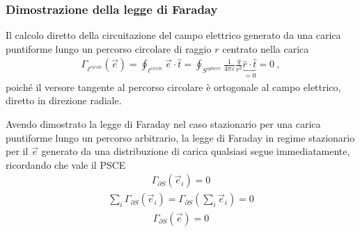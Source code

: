 \documentclass[letterpaper,10pt,italian]{jupyterBook}
\begin{document}
\subsubsection*{Dimostrazione della legge di Faraday}

\sphinxAtStartPar
{}
Il calcolo diretto della circuitazione del campo elettrico generato da una carica puntiforme lungo un percorso circolare di raggio \(r\) centrato nella carica
\begin{equation*}
\begin{split}\Gamma_{\ell^{circle}}(\vec{e}) = \oint_{\ell^{circle}} \vec{e} \cdot \hat{t} = \oint_{S^{sphere}} \frac{1}{4 \pi \varepsilon}\frac{q}{r^2} \underbrace{\hat{r} \cdot \hat{t}}_{=0} = 0 \ ,  \end{split}
\end{equation*}
\sphinxAtStartPar
poiché il versore tangente al percorso circolare è ortogonale al campo elettrico, diretto in direzione radiale.

\sphinxAtStartPar
{}

\sphinxAtStartPar
{}
Avendo dimostrato la legge di Faraday nel caso stazionario per una carica puntiforme lungo un percorso arbitrario, la legge di Faraday in regime stazionario per il \(\vec{e}\) generato da una distribuzione di carica qualsiasi segue immediatamente, ricordando che vale il PSCE
\begin{equation*}
\begin{split}\Gamma_{\partial S}(\vec{e}_i) = 0\end{split}
\end{equation*}\begin{equation*}
\begin{split}\sum_i \Gamma_{\partial S}(\vec{e}_i) = \Gamma_{\partial S} \left(\sum_i \vec{e}_i \right) = 0\end{split}
\end{equation*}\begin{equation*}
\begin{split}\Gamma_{\partial S}(\vec{e}) = 0\end{split}
\end{equation*}
\end{document}
